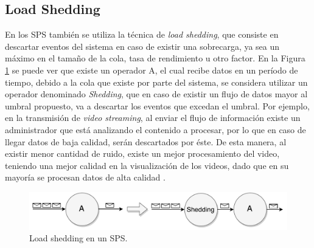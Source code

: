 

\subsection{Load Shedding}
\label{sec:loadSheddingBC}

En los SPS también se utiliza la técnica de \textit{load shedding}, que consiste en descartar eventos del sistema en caso de existir una sobrecarga, ya sea un máximo en el tamaño de la cola, tasa de rendimiento u otro factor. En la Figura \ref{fig:loadShedding} se puede ver que existe un operador A, el cual recibe datos en un período de tiempo, debido a la cola que existe por parte del sistema, se considera utilizar un operador denominado \textit{Shedding}, que en caso de existir un flujo de datos mayor al umbral propuesto, va a descartar los eventos que excedan el umbral. Por ejemplo, en la transmisión de \textit{video streaming}, al enviar el flujo de información existe un administrador que está analizando el contenido a procesar, por lo que en caso de llegar datos de baja calidad, serán descartados por éste. De esta manera, al existir menor cantidad de ruido, existe un mejor procesamiento del video, teniendo una mejor calidad en la visualización de los videos, dado que en su mayoría se procesan datos de alta calidad \citep{SheuC09}. 

\begin{figure}[!ht]
	\centering
	\includegraphics[scale=0.6]{images/LoadShedding.pdf}
	\caption{Load shedding en un SPS.}
	\label{fig:loadShedding}
\end{figure}

